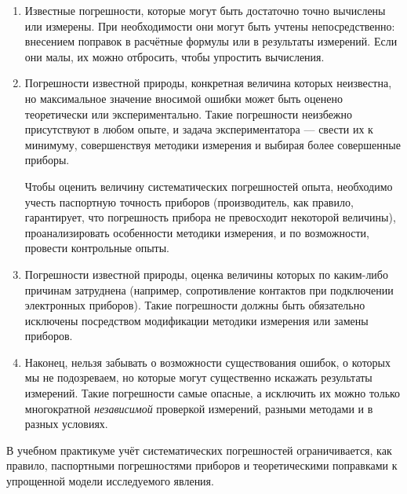 \begin{enumerate}
    \item Известные погрешности, которые могут быть достаточно точно вычислены
или измерены. При необходимости они могут быть учтены непосредственно:
внесением поправок в расчётные формулы или в результаты измерений.
Если они малы, их можно отбросить, чтобы упростить вычисления.

    \item Погрешности известной природы, конкретная величина которых неизвестна,
но максимальное значение вносимой ошибки может быть оценено теоретически
или экспериментально. Такие погрешности неизбежно присутствуют в любом
опыте, и задача экспериментатора --- свести их к минимуму,
совершенствуя методики измерения и выбирая более совершенные приборы.

    Чтобы оценить величину систематических погрешностей опыта, необходимо
учесть паспортную точность приборов (производитель, как правило, гарантирует,
что погрешность прибора не превосходит некоторой величины), проанализировать
особенности методики измерения, и по возможности, провести контрольные
опыты.

    \item Погрешности известной природы, оценка величины которых по каким-либо
причинам затруднена (например, сопротивление контактов при подключении
электронных приборов). Такие погрешности должны быть обязательно исключены
посредством модификации методики измерения или замены приборов.

    \item Наконец, нельзя забывать о возможности существования ошибок, о
которых мы не подозреваем, но которые могут существенно искажать результаты
измерений. Такие погрешности самые опасные, а исключить их можно только
многократной \emph{независимой} проверкой измерений, разными методами
и в разных условиях.
\end{enumerate}

В учебном практикуме учёт систематических погрешностей ограничивается,
как правило, паспортными погрешностями приборов и теоретическими поправками
к упрощенной модели исследуемого явления.
